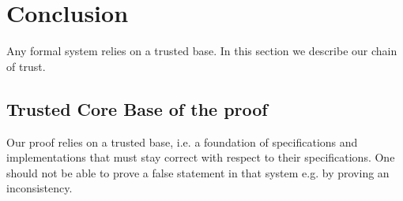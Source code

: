 \section{Conclusion}
\label{sec:Conclusion}

Any formal system relies on a trusted base. In this section we describe our
chain of trust.

\subsection{Trusted Core Base of the proof}

Our proof relies on a trusted base, i.e. a foundation of specifications
and implementations that must stay correct with respect to their specifications.
One should not be able to prove a false statement in that system e.g. by proving
an inconsistency.


